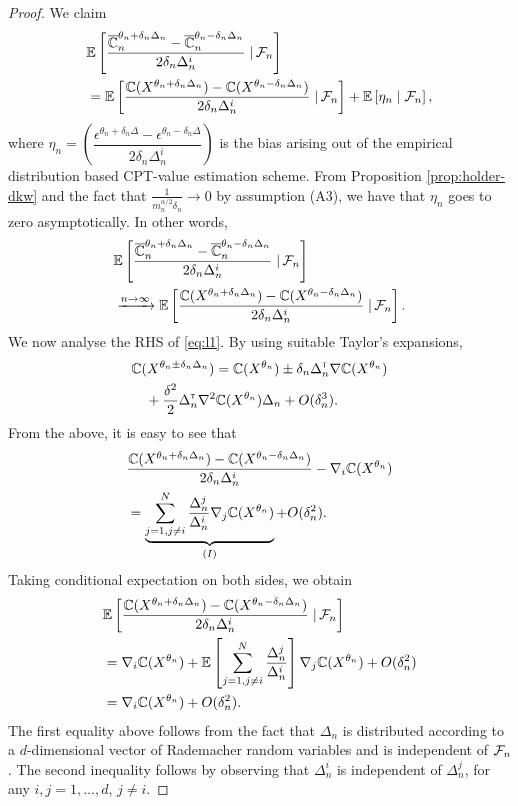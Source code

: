 \begin{proof}
We claim
\begin{align}
&\mathbb{E}\left[\dfrac{\overline {\mathbb{C}}_n^{\theta_n+\delta_n \Delta_n} -\overline {\mathbb{C}}_n^{\theta_n-\delta_n \Delta_n}}{2 \delta_n \Delta_n^{i}} \left.\right| \mathcal{F}_n\right] \\
&= \mathbb{E}\left[\dfrac{\mathbb{C}(X^{\theta_n + \delta_n \Delta_n}) - \mathbb{C}(X^{\theta_n - \delta_n \Delta_n})}{2 \delta_n \Delta_n^{i}} \left.\right| \mathcal{F}_n\right] + \mathbb{E}\left[ \eta_n \mid \mathcal{F}_n\right],
\end{align}
where $\eta_n = \left(\dfrac{\epsilon^{\theta_n +\delta_n\Delta} - \epsilon^{\theta_n-\delta_n\Delta}}{2\delta_n\Delta_n^{i}}\right)$
 is the bias arising out of the empirical distribution based CPT-value estimation scheme.
From Proposition \ref{prop:holder-dkw} and the fact that $\frac{1}{m_n^{\alpha/2} \delta_n} \rightarrow 0$ by assumption (A3), we have that
$\eta_n$ goes to zero asymptotically. In other words,
\begin{align}
&\mathbb{E}\left[\dfrac{\overline {\mathbb{C}}_n^{\theta_n+\delta_n \Delta_n} -\overline {\mathbb{C}}_n^{\theta_n-\delta_n \Delta_n}}{2 \delta_n \Delta_n^{i}} \left.\right| \mathcal{F}_n\right] \\
&\xrightarrow{n\rightarrow\infty}  \mathbb{E}\left[\dfrac{\mathbb{C}(X^{\theta_n + \delta_n \Delta_n}) -\mathbb{C}(X^{\theta_n - \delta_n \Delta_n})}{2 \delta_n \Delta_n^{i}} \left.\right| \mathcal{F}_n\right].  \label{eq:l1}
\end{align}
We now analyse the RHS of \eqref{eq:l1}.
By using suitable Taylor's expansions,
\begin{align*}
&\mathbb{C}(X^{\theta_n \pm \delta_n \Delta_n}) = \mathbb{C}(X^{\theta_n}) \pm \delta_n \Delta_n^\mathsf{\scriptscriptstyle T} \nabla \mathbb{C}(X^{\theta_n}) \\
&\quad+ \frac{\delta^2}{2} \Delta_n^\mathsf{\scriptscriptstyle T} \nabla^2 \mathbb{C}(X^{\theta_n})\Delta_n + O(\delta_n^3).
\end{align*}
From the above, it is easy to see that 
\begin{align*}
&\dfrac{\mathbb{C}(X^{\theta_n + \delta_n \Delta_n}) - \mathbb{C}(X^{\theta_n - \delta_n \Delta_n})}{2 \delta_n \Delta_n^i}
- \nabla_i \mathbb{C}(X^{\theta_n})\\
&=\underbrace{\sum_{j=1,j\not=i}^{N} \frac{\Delta_n^j}{\Delta_n^i}\nabla_j \mathbb{C}(X^{\theta_n})}_{(I)} + O(\delta_n^2).
\end{align*}
Taking conditional expectation on both sides, we obtain
\begin{align}
&\mathbb{E}\left[\dfrac{\mathbb{C}(X^{\theta_n + \delta_n \Delta_n}) - \mathbb{C}(X^{\theta_n - \delta_n \Delta_n})}{2 \delta_n \Delta_n^i} \left.\right| \mathcal{F}_n\right] \nonumber\\
&= \nabla_i \mathbb{C}(X^{\theta_n}) + \mathbb{E}\left[\sum_{j=1,j\not=i}^{N} \frac{\Delta_n^j}{\Delta_n^i}\right]\nabla_j \mathbb{C}(X^{\theta_n}) + O(\delta_n^2)\nonumber\\
&=  \nabla_i \mathbb{C}(X^{\theta_n}) + O(\delta_n^2).\label{eq:l2}
\end{align}
The first equality above follows from the fact that $\Delta_n$ is distributed according to a $d$-dimensional vector of Rademacher random variables and is independent of $\mathcal{F}_n$. The second inequality follows by observing that $\Delta_n^i$ is independent of $\Delta_n^j$, for any $i,j =1,\ldots,d$, $j\ne i$. 


\end{proof}
